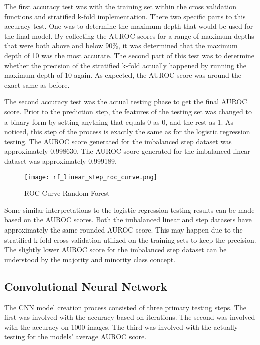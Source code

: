 \documentclass[conference]{IEEEtran}
\begin{document}
The first accuracy test was with the training set within the cross validation functions and stratified k-fold implementation. There two specific parts to this accuracy test. One was to determine the maximum depth that would be used for the final model. By collecting the AUROC scores for a range of maximum depths that were both above and below 90\%, it was determined that the maximum depth of 10 was the most accurate. The second part of this test was to determine whether the precision of the stratified k-fold actually happened by running the maximum depth of 10 again. As expected, the AUROC score was around the exact same as before.

The second accuracy test was the actual testing phase to get the final AUROC score. Prior to the prediction step, the features of the testing set was changed to a binary form by setting anything that equals 0 as 0, and the rest as 1. As noticed, this step of the process is exactly the same as for the logistic regression testing. The AUROC score generated for the imbalanced step dataset was approximately 0.998630. The AUROC score generated for the imbalanced linear dataset was approximately 0.999189.

\begin{figure}[htbp]
\centerline{\texttt{[image: rf\_linear\_step\_roc\_curve.png]}}
\caption{ROC Curve Random Forest}
\label{fig}
\end{figure}

Some similar interpretations to the logistic regression testing results can be made based on the AUROC scores. Both the imbalanced linear and step datasets have approximately the same rounded AUROC score. This may happen due to the stratified k-fold cross validation utilized on the training sets to keep the precision. The slightly lower AUROC score for the imbalanced step dataset can be understood by the majority and minority class concept. 

\subsection{Convolutional Neural Network}
The CNN model creation process consisted of three primary testing steps. The first was involved with the accuracy based on iterations. The second was involved with the accuracy on 1000 images. The third was involved with the actually testing for the models' average AUROC score. 
\end{document}
